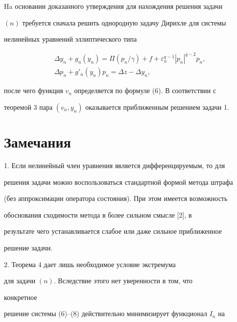 


Ha основании доказанного утверждения для нахождения решения задачи 


$(n)$ требуется сначала решить однородную задачу Дирихле для системы 


нелинейных уравнений эллиптического типа 


\begin{align*} %


&\Delta y_n+g_n(y_n)=\Pi(p_n/\gamma)+f 


+\varepsilon^{q-1}_n|p_n|^{q-2}p_n, \\ 


&\Delta p_n+g'_n(y_n)p_n=\Delta z-\Delta y_n, 


\end{align*} 


после чего функция $v_n$ определяется по формуле (6). В соответствии с 


теоремой 3 пара $(v_n,y_n)$ оказывается приближенным решением задачи 1. 


 


 


\section*{Замечания} 


 


1. Если нелинейный член уравнения является дифференцируемым, то для 


решения задачи можно воспользоваться стандартной формой метода штрафа 


(без аппроксимации оператора состояния). При этом имеется возможность 


обоснования сходимости метода в более сильном смысле [2], в 


результате чего устанавливается слабое или даже сильное приближенное 


решение задачи. 


\smallskip 


 


2. Теорема 4 дает лишь необходимое условие экстремума 


для задачи $(n)$. Вследствие этого нет уверенности в том, что 


конкретное 


решение системы (6)--(8) действительно минимизирует функционал $I_n$ на 


